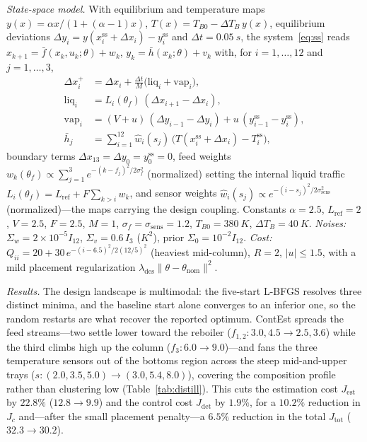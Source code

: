 \documentclass[twocolumn,amsthm]{autart}
\begin{document}
\emph{State-space model.} With equilibrium and temperature maps
$y(x)=\alpha x/(1+(\alpha-1)x)$, $T(x)=T_{B0}-\Delta T_B\,y(x)$, equilibrium
deviations $\Delta y_i=y(x_i^{\mathrm{ss}}+\Delta x_i)-y_i^{\mathrm{ss}}$ and
$\Delta t=\SI{0.05}{s}$, the system~\eqref{eq:ss} reads
$x_{k+1}=\bar f(x_k,u_k;\theta)+w_k$, $y_k=\bar h(x_k;\theta)+v_k$ with, for
$i=1,\dots,12$ and $j=1,\dots,3$,
\begin{subequations}\label{eq:distill-model}
\begin{align}
\Delta x_i^{+} &= \Delta x_i + \tfrac{\Delta t}{M}\big(\mathrm{liq}_i+\mathrm{vap}_i\big),\\
\mathrm{liq}_i &= L_i(\theta_f)\,(\Delta x_{i+1}-\Delta x_i),\\
\mathrm{vap}_i &= (V+u)\,(\Delta y_{i-1}-\Delta y_i) + u\,(y_{i-1}^{\mathrm{ss}}-y_i^{\mathrm{ss}}),\\
\bar h_j &= \textstyle\sum_{i=1}^{12}\hat w_i(s_j)\,\big(T(x_i^{\mathrm{ss}}+\Delta x_i)-T_i^{\mathrm{ss}}\big),
\end{align}
\end{subequations}
boundary terms $\Delta x_{13}=\Delta y_0=y_0^{\mathrm{ss}}=0$, feed weights
$w_k(\theta_f)\propto \sum_{j=1}^{3}e^{-(k-f_j)^2/2\sigma_f^2}$ (normalized)
setting the internal liquid traffic
$L_i(\theta_f)=L_{\mathrm{ref}}+F\sum_{k>i}w_k$, and sensor weights
$\hat w_i(s_j)\propto e^{-(i-s_j)^2/2\sigma_{\mathrm{sens}}^2}$
(normalized)---the maps carrying the design coupling. Constants $\alpha=2.5$,
$L_{\mathrm{ref}}=2$, $V=2.5$, $F=2.5$, $M=1$,
$\sigma_f=\sigma_{\mathrm{sens}}=1.2$, $T_{B0}=\SI{380}{K}$,
$\Delta T_B=\SI{40}{K}$. \emph{Noises:} $\Sigma_w=2\!\times\!10^{-5}I_{12}$,
$\Sigma_v=0.6\,I_3$ ($\si{K^2}$), prior $\Sigma_0=10^{-2}I_{12}$. \emph{Cost:}
$Q_{ii}=20+30\,e^{-(i-6.5)^2/2(12/5)^2}$ (heaviest mid-column), $R=2$,
$|u|\le1.5$, with a mild placement regularization
$\lambda_{\mathrm{des}}\lVert\theta-\theta_{\mathrm{nom}}\rVert^2$.

\emph{Results.} The design landscape is multimodal: the five-start L-BFGS resolves three distinct
minima, and the baseline start alone converges to an inferior one, so the random
restarts are what recover the reported optimum. ContEst spreads the feed
streams---two settle lower toward the reboiler ($f_{1,2}:3.0,4.5\to2.5,3.6$) while
the third climbs high up the column ($f_3:6.0\to9.0$)---and fans the three
temperature sensors out of the bottoms region across the steep mid-and-upper trays
($s:(2.0,3.5,5.0)\to(3.0,5.4,8.0)$), covering the composition profile rather than
clustering low (Table~\ref{tab:distill}). This cuts the estimation cost
$J_{\mathrm{est}}$ by $22.8\%$ ($12.8\to9.9$) and the control cost
$J_{\mathrm{det}}$ by $1.9\%$, for a $10.2\%$ reduction in $J_c$ and---after the
small placement penalty---a $6.5\%$ reduction in the total $J_{\mathrm{tot}}$
($32.3\to30.2$).
\end{document}
